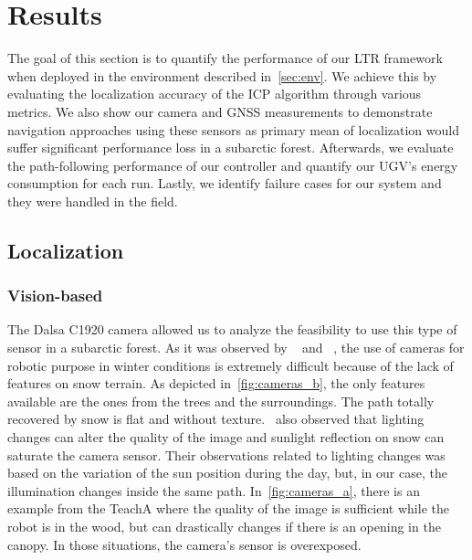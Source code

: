 \section{Results}
\label{sec:results}

The goal of this section is to quantify the performance of our \ac{LTR} framework when deployed in the environment described in~\autoref{sec:env}.
We achieve this by evaluating the localization accuracy of the \ac{ICP} algorithm through various metrics.
We also show our camera and \ac{GNSS} measurements to demonstrate navigation approaches using these sensors as primary mean of localization would suffer significant performance loss in a subarctic forest.
Afterwards, we evaluate the path-following performance of our controller and quantify our \ac{UGV}'s energy consumption for each run.
Lastly, we identify failure cases for our system and they were handled in the field.

\subsection{Localization}
\label{sec:res_loc}

\lightlipsum[1]

\subsubsection{Vision-based}
\label{sec:res_vis}

The Dalsa C1920 camera allowed us to analyze the feasibility to use this type of sensor in a subarctic forest. As it was observed by ~\citep{Williams2009} and ~\citep{Paton2017}, the use of cameras for robotic purpose in winter conditions is extremely difficult because of the lack of features on snow terrain. As depicted in~\autoref{fig:cameras_b}, the only features available are the ones from the trees and the surroundings. The path totally recovered by snow is flat and without texture.~\citep{Paton2017} also observed that lighting changes can alter the quality of the image and sunlight reflection on snow can saturate the camera sensor. Their observations related to lighting changes was based on the variation of the sun position during the day, but, in our case, the illumination changes inside the same path. In~\autoref{fig:cameras_a}, there is an example from the TeachA where the quality of the image is sufficient while the robot is in the wood, but can drastically changes if there is an opening in the canopy. In those situations, the camera's sensor is overexposed.

